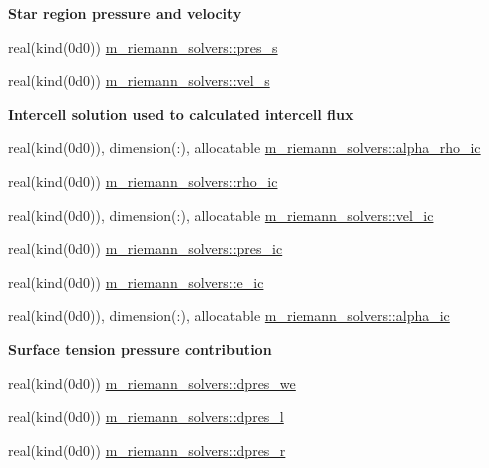 \begin{Indent}\textbf{ Star region pressure and velocity}\par
\begin{DoxyCompactItemize}
\item 
real(kind(0d0)) \hyperlink{namespacem__riemann__solvers_a41ed4fe5b767afd06561f8618d1d7012}{m\+\_\+riemann\+\_\+solvers\+::pres\+\_\+s}
\item 
real(kind(0d0)) \hyperlink{namespacem__riemann__solvers_a594596688927700679b18b484a495504}{m\+\_\+riemann\+\_\+solvers\+::vel\+\_\+s}
\end{DoxyCompactItemize}
\end{Indent}
\begin{Indent}\textbf{ Intercell solution used to calculated intercell flux}\par
\begin{DoxyCompactItemize}
\item 
real(kind(0d0)), dimension(\+:), allocatable \hyperlink{namespacem__riemann__solvers_a5f6f2613083fc30ff684c4183014a67c}{m\+\_\+riemann\+\_\+solvers\+::alpha\+\_\+rho\+\_\+ic}
\item 
real(kind(0d0)) \hyperlink{namespacem__riemann__solvers_a45a3cc332ef2fd7fc391a4ae82763f1a}{m\+\_\+riemann\+\_\+solvers\+::rho\+\_\+ic}
\item 
real(kind(0d0)), dimension(\+:), allocatable \hyperlink{namespacem__riemann__solvers_a81bfe96b264a5bba316c60965e787cbf}{m\+\_\+riemann\+\_\+solvers\+::vel\+\_\+ic}
\item 
real(kind(0d0)) \hyperlink{namespacem__riemann__solvers_a6c0b79ed34cb9be88abdd713eb207295}{m\+\_\+riemann\+\_\+solvers\+::pres\+\_\+ic}
\item 
real(kind(0d0)) \hyperlink{namespacem__riemann__solvers_ac997c4db6eac9f175803bc4fd81ef096}{m\+\_\+riemann\+\_\+solvers\+::e\+\_\+ic}
\item 
real(kind(0d0)), dimension(\+:), allocatable \hyperlink{namespacem__riemann__solvers_a0e605952054968421a3e444c8ba71063}{m\+\_\+riemann\+\_\+solvers\+::alpha\+\_\+ic}
\end{DoxyCompactItemize}
\end{Indent}
\begin{Indent}\textbf{ Surface tension pressure contribution}\par
\begin{DoxyCompactItemize}
\item 
real(kind(0d0)) \hyperlink{namespacem__riemann__solvers_a2378fe152ecbad0e98558ae177297493}{m\+\_\+riemann\+\_\+solvers\+::dpres\+\_\+we}
\item 
real(kind(0d0)) \hyperlink{namespacem__riemann__solvers_abc4d393041248b9e5f72a38f797e4683}{m\+\_\+riemann\+\_\+solvers\+::dpres\+\_\+l}
\item 
real(kind(0d0)) \hyperlink{namespacem__riemann__solvers_a25a8dae8bbd769f28c67f1747520f373}{m\+\_\+riemann\+\_\+solvers\+::dpres\+\_\+r}
\end{DoxyCompactItemize}
\end{Indent}
